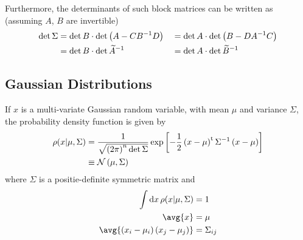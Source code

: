 \documentclass[nobib]{tufte-handout}
\begin{document}
Furthermore, the determinants of such block matrices can be written as (assuming $A$, $B$ are invertible)
\begin{align}
  \det{\Sigma} &= \det{B}\cdot\det{\left(A - CB^{-1}D\right)} &&= \det{A}\cdot\det{\left(B - DA^{-1}C\right)}\label{e:block_det}\\
  &= \det{B}\cdot\det{\widetilde{A}^{-1}} &&= \det{A}\cdot\det{\widetilde{B}^{-1}}\notag
\end{align}

\subsection{Gaussian Distributions}
If $x$ is a multi-variate Gaussian random variable, with mean $\mu$ and variance $\Sigma$, the probability density function
is given by
\begin{align}
  \rho(x\lvert\mu, \Sigma) &= \frac{1}{\sqrt{\left(2\pi\right)^n \det{\Sigma}}} \exp{\left[-\frac{1}{2}\left(x - \mu\right)^\textrm{t} 
  \Sigma^{-1} \left(x - \mu\right)\right]}\label{e:gaussian_pdf}\\
  &\equiv \mathcal{N}\left(\mu, \Sigma\right)\notag
\end{align}
where $\Sigma$ is a positie-definite symmetric matrix and 
\begin{align}
  \int\df{x}\rho(x\lvert\mu, \Sigma) &= 1\label{e:gaussian_norm}\\
  \avg{x} &= \mu \label{e:gaussian_mu}\\
  \avg{\left(x_i-\mu_i\right)\left(x_j - \mu_j\right)} &= \Sigma_{ij}\label{e:gaussian_sigma}
  \end{align}
\end{document}
